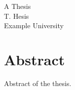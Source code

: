 \documentclass[a4paper,11pt,twoside,openright]{book}
\begin{document}
\frontmatter
\begin{titlepage}\centering\Huge A Thesis\\[1cm]\Large T. Hesis\\Example University\end{titlepage}
\chapter*{Abstract}Abstract of the thesis.
\tableofcontents\listoffigures\listoftables
\mainmatter



\appendix

\backmatter

\end{document}

